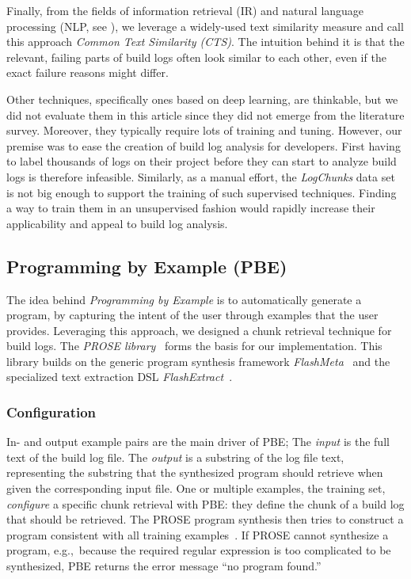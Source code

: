 \documentclass[10pt,journal,compsoc]{IEEEtran}
\begin{document}
Finally, from the fields of information retrieval (IR) and natural
language
processing (NLP, see ), we leverage
a widely-used text similarity measure and call this approach \emph{Common
Text Similarity (CTS)}.
The intuition behind it is that the relevant,
failing parts of build logs often look similar to each other, even if
the exact failure reasons might differ.

Other techniques, specifically ones based on deep learning, are
thinkable, but we did not evaluate them in this article since they did
not emerge from the literature survey.
Moreover, they typically
require lots of training and tuning.
However, our premise was to ease
the creation of build log analysis for developers.
First having to
label thousands of logs on their project before they can start to
analyze build logs is therefore infeasible.
Similarly, as a manual
effort, the \emph{LogChunks} data set is not big enough to support the
training of such supervised techniques.
Finding a way to train them in
an unsupervised fashion would rapidly increase their applicability and
appeal to build log analysis.

\subsection{Programming by Example (PBE)}
The idea behind \emph{Programming by Example} is to automatically
generate a program, by capturing the
intent of the user through examples that the user provides.
Leveraging this approach, we designed a chunk retrieval technique
for build logs.
The \emph{PROSE library}~\cite{prose2019webpage} forms the basis for
our implementation.
This library builds on the generic program synthesis framework
\emph{FlashMeta}~\cite{polozov2015flashmeta:} and the specialized
text extraction DSL \emph{FlashExtract}~\cite{le2014flashextract:}.

\subsubsection{Configuration}
In- and output example pairs are the main driver of PBE;
The \emph{input} is the full text of the build log file.
The \emph{output} is
a substring of the log file text, representing the
substring that the synthesized program should retrieve when
given the corresponding input file.
One or multiple examples, the
training set, \emph{configure} a specific chunk retrieval with PBE:
they define the chunk of a build log that should be retrieved.
The PROSE program synthesis then tries to construct a program
consistent with all training
examples~\cite{mitchell1982generalization}.
If PROSE cannot synthesize a program, e.g.,\
because the required regular expression
is too complicated to be synthesized, PBE returns the
error message ``no program found.''
\end{document}
